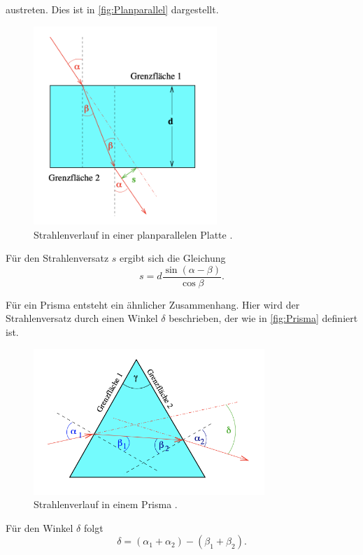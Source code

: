 austreten. Dies ist in \autoref{fig:Planparallel} dargestellt.
\begin{figure}[H]
    \centering
    \includegraphics[height=7.5cm]{content/pics/Planparallel.png}
    \caption{Strahlenverlauf in einer planparallelen Platte \cite{v400}.}
    \label{fig:Planparallel}
\end{figure}
Für den Strahlenversatz $s$ ergibt sich die Gleichung
\begin{equation}
    s = d \frac{\sin(\alpha-\beta)}{\cos\beta}. \label{eq:Strahlenversatz}
\end{equation}

Für ein Prisma entsteht ein ähnlicher Zusammenhang. Hier wird der Strahlenversatz durch einen Winkel $\delta$ beschrieben, der 
wie in \autoref{fig:Prisma} definiert ist.
\begin{figure}[H]
  \centering
  \includegraphics[height=5.5cm]{content/pics/Prisma.png}
  \caption{Strahlenverlauf in einem Prisma \cite{v400}.}
  \label{fig:Prisma}
\end{figure}
Für den Winkel $\delta$ folgt
\begin{equation}
  \delta = (\alpha_1+\alpha_2) - (\beta_1+\beta_2). \label{eq:Winkelbeziehung}
\end{equation}

